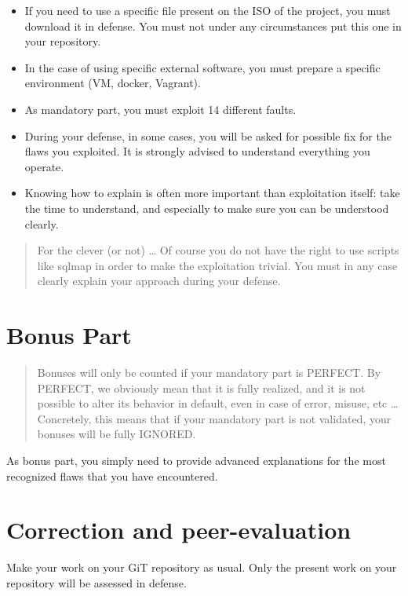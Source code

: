 \begin{itemize}
\tightlist{}
\item
  If you need to use a specific file present on the ISO of the project,
  you must download it in defense. You must not under any circumstances
  put this one in your repository.
\item
  In the case of using specific external software, you must prepare a
  specific environment (VM, docker, Vagrant).
\item
  As mandatory part, you must exploit 14 different faults.
\item
  During your defense, in some cases, you will be asked for possible fix
  for the flaws you exploited. It is strongly advised to understand
  everything you operate.
\item
  Knowing how to explain is often more important than exploitation
  itself: take the time to understand, and especially to make sure you
  can be understood clearly.
\end{itemize}

\begin{quote}
For the clever (or not) \ldots{} Of course you do not have the right to
use scripts like sqlmap in order to make the exploitation trivial. You
must in any case clearly explain your approach during your defense.
\end{quote}

\section{Bonus Part}

\begin{quote}
Bonuses will only be counted if your mandatory part is PERFECT. By
PERFECT, we obviously mean that it is fully realized, and it is not
possible to alter its behavior in default, even in case of error,
misuse, etc \ldots{} Concretely, this means that if your mandatory part
is not validated, your bonuses will be fully IGNORED.
\end{quote}

As bonus part, you simply need to provide advanced explanations for the
most recognized flaws that you have encountered.

\section{Correction and peer-evaluation}

Make your work on your GiT repository as usual. Only the present work on
your repository will be assessed in defense.

